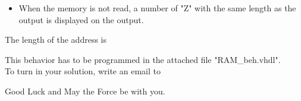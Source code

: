 \documentclass[a4paper,12pt]{article}
\begin{document}
\begin{itemize}
\item When the memory is not read, a number of "Z" with the same length as the output is displayed on the output.

\end{itemize}

 The length of the address is %
\begin{itemize}
\end{itemize}

This behavior has to be programmed in the attached file "RAM\_beh.vhdl".
\\

To turn in your solution, write an email to %

\vspace{0.7cm}
Good Luck and May the Force be with you.
\end{document}
